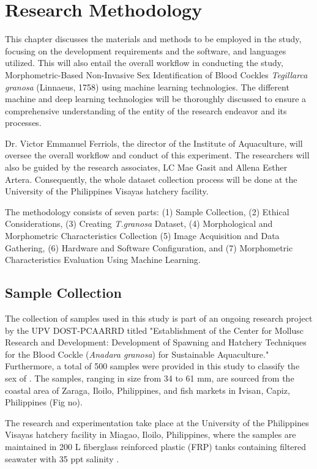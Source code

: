 \chapter{Research Methodology}
\label{sec:methodology}

This chapter discusses the materials and methods to be employed in the study, focusing on the development requirements and the software, and languages utilized. This will also entail the overall workflow in conducting the study, Morphometric-Based Non-Invasive Sex Identification of Blood Cockles \textit{Tegillarca granosa} (Linnaeus, 1758) using machine learning technologies. The different machine and deep learning technologies will be thoroughly discussed to ensure a comprehensive understanding of the entity of the research endeavor and its processes. 

Dr. Victor Emmanuel Ferriols, the director of the Institute of Aquaculture, will oversee the overall workflow and conduct of this experiment. The researchers will also be guided by the research associates, LC Mae Gasit and Allena Esther Artera. Consequently, the whole dataset collection process will be done at the University of the Philippines Visayas hatchery facility. 

The methodology consists of seven parts: (1) Sample Collection, (2) Ethical Considerations, (3) Creating \textit{T.granosa} Dataset, (4) Morphological and Morphometric Characteristics Collection (5) Image Acquisition and Data Gathering, (6) Hardware and Software Configuration, and (7) Morphometric Characteristics Evaluation Using Machine Learning. 

\section{Sample Collection}
\label{sec:samplecollect}
The collection of \Tgranosa samples used in this study is part of an ongoing research project by the UPV DOST-PCAARRD titled "Establishment of the Center for Mollusc Research and Development: Development of Spawning and Hatchery Techniques for the Blood Cockle (\textit{Anadara granosa}) for Sustainable Aquaculture." Furthermore, a total of 500 samples were provided in this study to classify the sex of \Tgranosa.  The samples, ranging in size from 34 to 61 mm, are sourced from the coastal area of Zaraga, Iloilo, Philippines, and fish markets in Ivisan, Capiz, Philippines (Fig no). 

The research and experimentation take place at the University of the Philippines Visayas hatchery facility in Miagao, Iloilo, Philippines, where the samples are maintained in 200 L fiberglass reinforced plastic (FRP) tanks containing filtered seawater with 35 ppt salinity \cite{miranda2023}. 

